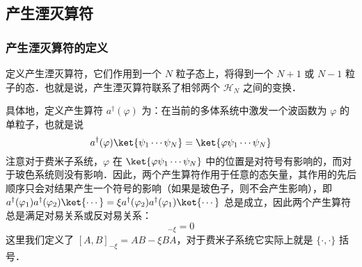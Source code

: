 \subsection{产生湮灭算符}
\subsubsection{产生湮灭算符的定义}
定义产生湮灭算符，它们作用到一个 $N$ 粒子态上，将得到一个 $N+1$ 或 $N-1$ 粒子的态．也就是说，产生湮灭算符联系了相邻两个 $\mathcal{H}_N$ 之间的变换．

具体地，定义产生算符 $a^\dagger(\varphi)$ 为：在当前的多体系统中激发一个波函数为 $\varphi$ 的单粒子，也就是说
\begin{equation}\label{SecQua_eq3}
a^\dagger(\varphi)\ket{\psi_1\cdots\psi_N}=\ket{\varphi\psi_1\cdots\psi_N}
\end{equation}
注意对于费米子系统，$\varphi$ 在 $\ket{\varphi\psi_1\cdots\psi_N}$ 中的位置是对符号有影响的，而对于玻色系统则没有影响．因此，两个产生算符作用于任意的态矢量，其作用的先后顺序只会对结果产生一个符号的影响（如果是玻色子，则不会产生影响），即 $a^\dagger(\varphi_1)a^\dagger(\varphi_2)\ket{\cdots}=\xi a^\dagger(\varphi_2)a^\dagger(\varphi_1)\ket{\cdots}$ 总是成立，因此两个产生算符总是满足对易关系或反对易关系：
\begin{equation}
[a^\dagger(\varphi_1),a^\dagger(\varphi_2)]_{-\xi}=0
\end{equation}
这里我们定义了 $[A,B]_{-\xi}=AB-\xi BA$，对于费米子系统它实际上就是 $\{\cdot,\cdot \}$ 括号．

